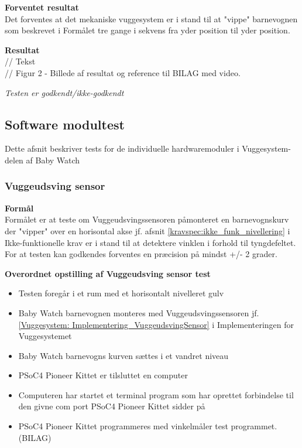 \textbf{Forventet resultat} \\
Det forventes at det mekaniske vuggesystem er i stand til at "vippe" barnevognen som beskrevet i Formålet tre gange i sekvens fra yder position til yder position.

\textbf{Resultat} \\
// Tekst \\

// Figur 2 - Billede af resultat og reference til BILAG med video.

\textit{Testen er godkendt/ikke-godkendt}




\subsection{Software modultest}
Dette afsnit beskriver tests for de individuelle hardwaremoduler i Vuggesystem-delen af Baby Watch
\subsubsection{Vuggeudsving sensor}
\textbf{Formål} \\
Formålet er at teste om Vuggeudsvingssensoren påmonteret en barnevognskurv der "vipper" over en horisontal akse jf. afsnit \ref{kravspec:ikke_funk_nivellering} i Ikke-funktionelle krav er i stand til at detektere vinklen i forhold til tyngdefeltet. For at testen kan godkendes forventes en præcision på mindst +/- 2 grader.

\textbf{Overordnet opstilling af Vuggeudsving sensor test}

\begin{itemize}
		\item Testen foregår i et rum med et horisontalt nivelleret gulv
	\item Baby Watch barnevognen monteres med Vuggeudsvingssensoren jf.\ref{Vuggesystem: Implementering_VuggeudsvingSensor} i Implementeringen for Vuggesystemet 
	\item Baby Watch barnevogns kurven sættes i et vandret niveau
	\item PSoC4 Pioneer Kittet er tilsluttet en computer
	\item Computeren har startet et terminal program som har oprettet forbindelse til den givne com port PSoC4 Pioneer Kittet sidder på
	\item PSoC4 Pioneer Kittet programmeres med vinkelmåler test programmet. (BILAG)
\end{itemize}

